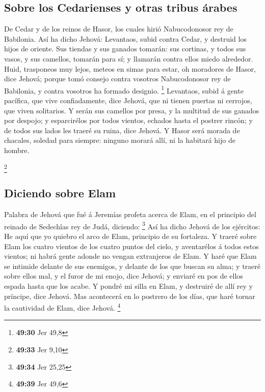 \hypertarget{sobre-los-cedarienses-y-otras-tribus-uxe1rabes}{%
\subsection{Sobre los Cedarienses y otras tribus
árabes}\label{sobre-los-cedarienses-y-otras-tribus-uxe1rabes}}

 De Cedar y de los reinos de Hasor, los cuales hirió
Nabucodonosor rey de Babilonia. Así ha dicho Jehová: Levantaos, subid
contra Cedar, y destruid los hijos de oriente.  Sus tiendas
y sus ganados tomarán: sus cortinas, y todos sus vasos, y sus camellos,
tomarán para sí; y llamarán contra ellos miedo alrededor. 
Huid, trasponeos muy lejos, meteos en simas para estar, oh moradores de
Hasor, dice Jehová; porque tomó consejo contra vosotros Nabucodonosor
rey de Babilonia, y contra vosotros ha formado designio. \footnote{\textbf{49:30}
  Jer 49,8}  Levantaos, subid á gente pacífica, que vive
confiadamente, dice Jehová, que ni tienen puertas ni cerrojos, que viven
solitarios.  Y serán sus camellos por presa, y la multitud
de sus ganados por despojo; y esparcirélos por todos vientos, echados
hasta el postrer rincón; y de todos sus lados les traeré su ruina, dice
Jehová.  Y Hasor será morada de chacales, soledad para
siempre: ninguno morará allí, ni la habitará hijo de hombre.

\footnote{\textbf{49:33} Jer 9,10}

\hypertarget{diciendo-sobre-elam}{%
\subsection{Diciendo sobre Elam}\label{diciendo-sobre-elam}}

 Palabra de Jehová que fué á Jeremías profeta acerca de
Elam, en el principio del reinado de Sedechîas rey de Judá, diciendo:
\footnote{\textbf{49:34} Jer 25,25}  Así ha dicho Jehová de
los ejércitos: He aquí que yo quiebro el arco de Elam, principio de su
fortaleza.  Y traeré sobre Elam los cuatro vientos de los
cuatro puntos del cielo, y aventarélos á todos estos vientos; ni habrá
gente adonde no vengan extranjeros de Elam.  Y haré que
Elam se intimide delante de sus enemigos, y delante de los que buscan su
alma; y traeré sobre ellos mal, y el furor de mi enojo, dice Jehová; y
enviaré en pos de ellos espada hasta que los acabe.  Y
pondré mi silla en Elam, y destruiré de allí rey y príncipe, dice
Jehová.  Mas acontecerá en lo postrero de los días, que
haré tornar la cautividad de Elam, dice Jehová. \footnote{\textbf{49:39}
  Jer 49,6}

